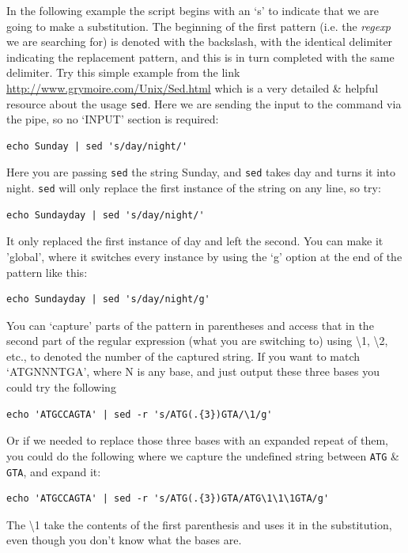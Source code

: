 \documentclass[a4paper,12pt,twoside]{memoir}
\begin{document}
\begin{steps}
In the following example the script begins with an `s' to indicate that we are going to make a substitution.
The beginning of the first pattern (i.e. the \textit{regexp} we are searching for) is denoted with the backslash, with the identical delimiter indicating the replacement pattern, and this is in turn completed with the same delimiter.
Try this simple example from the link \url{http://www.grymoire.com/Unix/Sed.html} which is a very detailed \& helpful resource about the usage \texttt{sed}.
Here we are sending the input to the command via the pipe, so no `INPUT' section is required: \\
\begin{lstlisting}
echo Sunday | sed 's/day/night/' 
\end{lstlisting}
Here you are passing \texttt{sed} the string Sunday, and \texttt{sed} takes day and turns it into night.  
\texttt{sed} will only replace the first instance of the string on any line, so try: \\
\begin{lstlisting}
echo Sundayday | sed 's/day/night/' 
\end{lstlisting}
It only replaced the first instance of day and left the second.  You can make it 'global', where it switches every instance by using the `g' option at the end of the pattern like this: \\
\begin{lstlisting}
echo Sundayday | sed 's/day/night/g' 
\end{lstlisting}
You can `capture' parts of the pattern in parentheses and access that in the second part of the regular expression (what you are switching to) using \textbackslash 1, \textbackslash 2, etc., to denoted the number of the captured string.
If you want to match `ATGNNNTGA', where N is any base, and just output these three bases you could try the following
\begin{lstlisting}
echo 'ATGCCAGTA' | sed -r 's/ATG(.{3})GTA/\1/g'
\end{lstlisting}
Or if we needed to replace those three bases with an expanded repeat of them, you could do the following where we capture the undefined string between \texttt{ATG} \& \texttt{GTA}, and expand it: \\
\begin{lstlisting}
echo 'ATGCCAGTA' | sed -r 's/ATG(.{3})GTA/ATG\1\1\1GTA/g'
\end{lstlisting}
The \textbackslash 1 take the contents of the first parenthesis and uses it in the substitution, even though you don't know what the bases are.

\end{steps}
\end{document}
